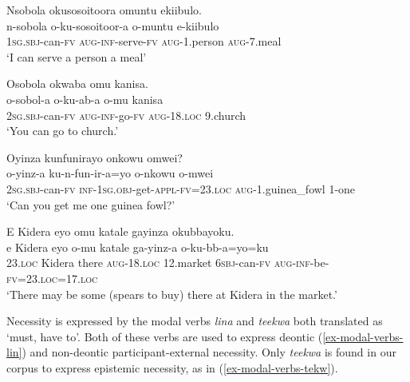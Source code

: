 \ea \label{ex-modal-verbs-sobol}
\begin{xlist}
\ex \label{ex-modal-verbs-sobol1}
	\glll Nsobola 	okusosoitoora	omuntu		ekiibulo.\\
	  n-sobola 	o-ku-sosoitoor-a	o-muntu		e-kiibulo\\
		\textsc{1sg.sbj}-can-\textsc{fv}	\textsc{aug}-\textsc{inf}-serve-\textsc{fv}	\textsc{aug}-1.person		\textsc{aug}-7.meal\\
	\glt ‘I can serve a person a meal’
	
\ex \label{ex-modal-verbs-sobol2}
	\glll Osobola	okwaba	omu		kanisa.\\
		 o-sobol-a	o-ku-ab-a	o-mu		kanisa\\
		2\textsc{sg.sbj}-can-\textsc{fv}	\textsc{aug}-\textsc{inf}-go-\textsc{fv}	\textsc{aug}-18.\textsc{loc}	9.church\\
	\glt ‘You can go to church.’
\end{xlist}
\z

\ea \label{ex-modal-verbs-yinz}
\begin{xlist}
\ex \label{ex-modal-verbs-yinz1}
	\glll Oyinza	kunfunirayo		onkowu	 omwei?\\
		  o-yinz-a	ku-n-fun-ir-a=yo				o-nkowu		o-mwei\\
		2\textsc{sg.sbj}-can-\textsc{fv}	\textsc{inf}-\textsc{1sg.obj}-get-\textsc{appl}-\textsc{fv}=23.\textsc{loc}		\textsc{aug}-1.guinea\_fowl	1-one\\
	\glt ‘Can you get me one guinea fowl?’

	
\ex \label{ex-modal-verbs-yinz2}
	\glll E		Kidera	eyo	omu 		katale		gayinza { } { } { } okubbayoku.\\
		 e		Kidera	eyo	o-mu 		katale		ga-yinz-a { } { } { } o-ku-bb-a=yo=ku\\
			23.\textsc{loc}	Kidera	there	 \textsc{aug}-18.\textsc{loc}	12.market	\textsc{6sbj}-can-\textsc{fv} { } { } { } \textsc{aug}-\textsc{inf}-be-\textsc{fv}=23.\textsc{loc}=17.\textsc{loc}\\
	\glt ‘There may be some (spears to buy) there at Kidera in the market.’
\end{xlist}
\z

Necessity is expressed by the modal verbs \emph{lina} and \emph{teekwa} both translated as ‘must, have to’. 
Both of these verbs are used to express deontic (\ref{ex-modal-verbs-lin}) and non-deontic participant-external necessity. 
Only \emph{teekwa} is found in our corpus to express epistemic necessity, as in (\ref{ex-modal-verbs-tekw}).

